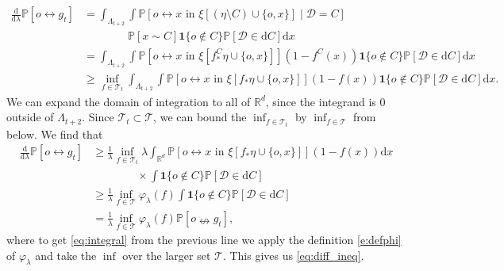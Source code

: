 \documentclass[a4paper,12pt]{scrartcl}
\renewcommand{\P}{\mathbb{P}}
\renewcommand{\d}{\mathrm{d}}
\newcommand{\reals}{\mathbb{R}}
\theoremstyle{definition}
\theoremstyle{remark}
\begin{document}
  \begin{align}
    \frac{\d}{\d\lambda}\P[o\leftrightarrow g_t]
    & =
    \int_{\Lambda_{t+2}}\int
    \P[
      o\leftrightarrow x\text{ in } \xi[(\eta\setminus C)\cup\{o,x\}]
      \mid
      \mathcal D = C
    ]                          \\
    & \qquad \qquad \mathbb P[
      x\sim C
    ]
    \mathbf{1}\{o\not\in C\}
    \P[\mathcal D\in \d C]\d x
    \\
    & =
    \int_{\Lambda_{t+2}}\int
    \P[
      o\leftrightarrow x\text{ in }
      \xi[f_*^C\eta\cup\{o,x\}]
    ]
    (1 - f^C(x))
    \mathbf{1}\{o\not\in C\}
    \P[\mathcal D\in \d C]\d x \\
    & \geq
    \inf_{f\in\mathcal T_t}
    \int_{\Lambda_{t+2}}\int
    \P[
      o\leftrightarrow x\text{ in }
      \xi[f_*\eta\cup\{o,x\}]
    ]
    (1 - f(x))
    \mathbf{1}\{o\not\in C\}
    \P[\mathcal D\in \d C]\d x.
  \end{align}
  We can expand the domain of integration to all of $\reals^d$, since the integrand is $0$ outside of $\Lambda_{t+2}$. Since $\mathcal T_t\subset \mathcal T$, we can  bound the $\inf_{f\in\mathcal T_t}$ by $\inf_{f\in\mathcal T}$ from below. We find that
  \begin{align}
    \frac{\d}{\d\lambda}\P[o\leftrightarrow g_t]
    & \geq
    \frac1\lambda
    \inf_{f\in\mathcal T_t}
    \lambda
    \int_{\reals^d}
    \P[
      o\leftrightarrow x\text{ in }
      \xi[ f_*\eta\cup\{o,x\}]
    ]
    (1 - f(x))
    \d x                        \\
    & \qquad\qquad\times
    \int \mathbf{1}\{o\not\in C\}
    \P[\mathcal D\in \d C]      \\
    & \geq \label{eq:integral}
    \frac1\lambda
    \inf_{f\in\mathcal T} \varphi_\lambda(f)
    \int
    \mathbf{1}\{o\not\in C\}
    \P[\mathcal D\in \d C]      \\
    & =
    \frac1\lambda
    \inf_{f\in\mathcal T} \varphi_\lambda(f)
    \P[o\nleftrightarrow g_t],
  \end{align}
  where to get \eqref{eq:integral} from the previous line we apply the definition
  \eqref{e:defphi} of $\varphi_\lambda$ and take the $\inf$ over the larger set $\mathcal T$. This gives us \eqref{eq:diff_ineq}.
\end{document}
